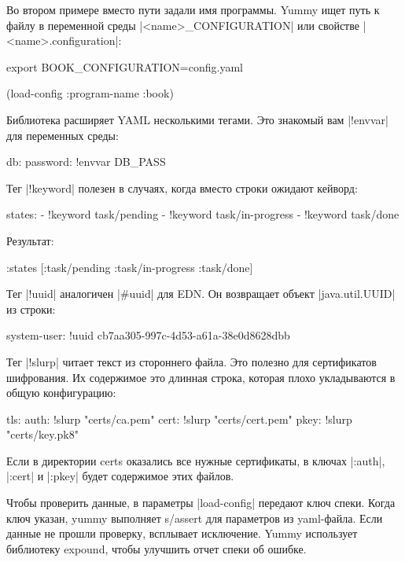 Во втором примере вместо пути задали имя программы. Yummy ищет путь к файлу в
переменной среды \spverb|<name>_CONFIGURATION| или свойстве \spverb|<name>.configuration|:

\begin{code}
export BOOK_CONFIGURATION=config.yaml
\end{code}

\begin{code}
(load-config {:program-name :book})
\end{code}

Библиотека расширяет YAML несколькими тегами. Это знакомый вам \spverb|!envvar| для
переменных среды:

\begin{code}
db:
  password: !envvar DB_PASS
\end{code}

Тег \spverb|!keyword| полезен в случаях, когда вместо строки ожидают кейворд:

\begin{code}
states:
  - !keyword task/pending
  - !keyword task/in-progress
  - !keyword task/done
\end{code}

Результат:

\begin{code}
{:states [:task/pending :task/in-progress :task/done]}
\end{code}

Тег \spverb|!uuid| аналогичен \spverb|#uuid| для EDN. Он возвращает объект
\spverb|java.util.UUID| из строки:

\begin{code}
system-user: !uuid cb7aa305-997c-4d53-a61a-38e0d8628dbb
\end{code}

Тег \spverb|!slurp| читает текст из стороннего файла. Это полезно для сертификатов
шифрования. Их содержимое это длинная строка, которая плохо укладываются в общую
конфигурацию:

\begin{code}
tls:
  auth: !slurp "certs/ca.pem"
  cert: !slurp "certs/cert.pem"
  pkey: !slurp "certs/key.pk8"
\end{code}

Если в директории certs оказались все нужные сертификаты, в ключах \spverb|:auth|,
\spverb|:cert| и \spverb|:pkey| будет содержимое этих файлов.

Чтобы проверить данные, в параметры \spverb|load-config| передают ключ спеки. Когда
ключ указан, yummy выполняет s/assert для параметров из yaml-файла. Если данные
не прошли проверку, всплывает исключение. Yummy использует библиотеку expound,
чтобы улучшить отчет спеки об ошибке.

